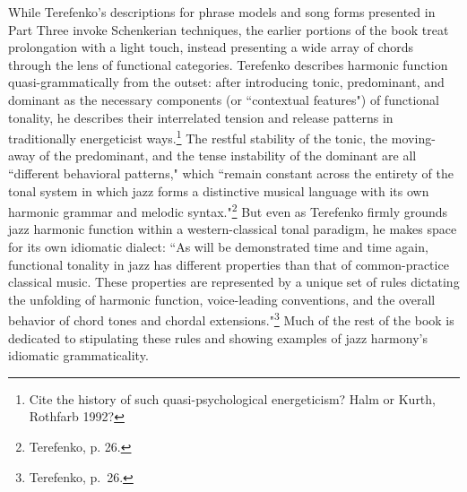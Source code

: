 While Terefenko's descriptions for phrase models and song forms presented in Part Three invoke Schenkerian techniques, the earlier portions of the book treat prolongation with a light touch, instead presenting a wide array of chords through the lens of functional categories.  Terefenko describes harmonic function quasi-grammatically from the outset:  after introducing tonic, predominant, and dominant as the necessary components (or ``contextual features") of functional tonality, he describes their interrelated tension and release patterns in traditionally energeticist ways.\footnote{Cite the history of such quasi-psychological energeticism?  Halm or Kurth, Rothfarb 1992?}  The restful stability of the tonic, the moving-away of the predominant, and the tense instability of the dominant are all ``different behavioral patterns," which ``remain constant across the entirety of the tonal system in which jazz forms a distinctive musical language with its own harmonic grammar and melodic syntax."\footnote{Terefenko, p. 26.}  But even as Terefenko firmly grounds jazz harmonic function within a western-classical tonal paradigm, he makes space for its own idiomatic dialect: ``As will be demonstrated time and time again, functional tonality in jazz has different properties than that of common-practice classical music.  These properties are represented by a unique set of rules dictating the unfolding of harmonic function, voice-leading conventions, and the overall behavior of chord tones and chordal extensions."\footnote{Terefenko, p.\ 26.}  Much of the rest of the book is dedicated to stipulating these rules and showing examples of jazz harmony's idiomatic grammaticality.

